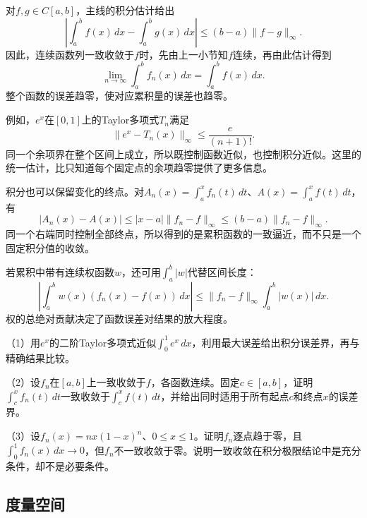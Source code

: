 对\(f,g\in C[a,b]\)，主线的积分估计给出
\begin{equation}\label{eq:calculus-function-integral-bound}
 \left|\int_a^b f(x)\,dx-\int_a^b g(x)\,dx\right|
 \le(b-a)\|f-g\|_\infty.
\end{equation}
因此，连续函数列一致收敛于\(f\)时，先由上一小节知\(f\)连续，再由此估计得到
\begin{equation*}
 \lim_{n\to\infty}\int_a^b f_n(x)\,dx=\int_a^b f(x)\,dx.
\end{equation*}
整个函数的误差趋零，使对应累积量的误差也趋零。

例如，\(e^x\)在\([0,1]\)上的Taylor多项式\(T_n\)满足
\begin{equation*}
 \|e^x-T_n(x)\|_\infty\le\frac e{(n+1)!}.
\end{equation*}
同一个余项界在整个区间上成立，所以既控制函数近似，也控制积分近似。这里的统一估计，比只知道每个固定点的余项趋零提供了更多信息。

积分也可以保留变化的终点。对\(A_n(x)=\int_a^xf_n(t)\,dt\)、\(A(x)=\int_a^xf(t)\,dt\)，有
\begin{equation*}
 |A_n(x)-A(x)|\le|x-a|\|f_n-f\|_\infty
 \le(b-a)\|f_n-f\|_\infty.
\end{equation*}
同一个右端同时控制全部终点，所以得到的是累积函数的一致逼近，而不只是一个固定积分值的收敛。

若累积中带有连续权函数\(w\)，还可用\(\int_a^b|w|\)代替区间长度：
\begin{equation*}
 \left|\int_a^bw(x)(f_n(x)-f(x))\,dx\right|
 \le\|f_n-f\|_\infty\int_a^b|w(x)|\,dx.
\end{equation*}
权的总绝对贡献决定了函数误差对结果的放大程度。

\begin{exercise}
\mbox{}\par\nobreak

（1）用\(e^x\)的二阶Taylor多项式近似\(\int_0^1e^x\,dx\)，利用最大误差给出积分误差界，再与精确结果比较。

（2）设\(f_n\)在\([a,b]\)上一致收敛于\(f\)，各函数连续。固定\(c\in[a,b]\)，证明\(\int_c^xf_n(t)\,dt\)一致收敛于\(\int_c^xf(t)\,dt\)，并给出同时适用于所有起点\(c\)和终点\(x\)的误差界。

（3）设\(f_n(x)=nx(1-x)^n\)、\(0\le x\le1\)。证明\(f_n\)逐点趋于零，且\(\int_0^1f_n(x)\,dx\to0\)，但\(f_n\)不一致收敛于零。说明一致收敛在积分极限结论中是充分条件，却不是必要条件。
\end{exercise}

\subsection{度量空间}

